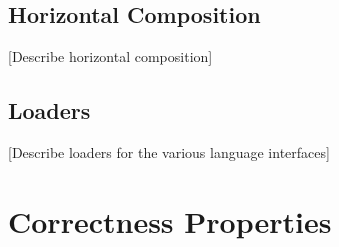 \documentclass[sigplan,10pt,review,anonymous]{acmart}
\newcommand{\kw}[1]{\ensuremath{ \mathsf{#1} }}
\newcommand{\bind}{\gg\!\!=}
\begin{document}


\cbstart
\subsection{Horizontal Composition} \label{sec:sem:linker} %

[Describe horizontal composition]


\subsection{Loaders} \label{sec:sem:loader} %

[Describe loaders for the various language interfaces]



\section{Correctness Properties} \label{sec:corr} %
\cbend
\end{document}

